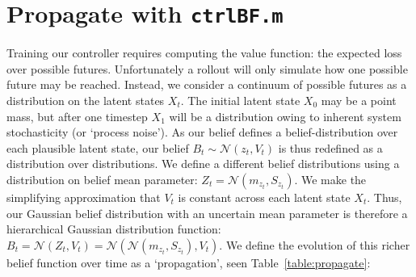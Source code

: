 \documentclass[9pt]{article}
\newcommand{\N}{\mathcal{N}}
\newcommand{\m}[1]{m_{#1}}                  %
\newcommand{\s}[1]{S_{#1}}                  %
\newcommand{\now}[1]{#1_t}                  %
\newcommand{\pno}[1]{#1_{t}}  %
\begin{document}
\newpage %


\section{Propagate with \texttt{ctrlBF.m}}

Training our controller requires computing the value function: the expected loss over possible futures.
Unfortunately a rollout will only simulate how one possible future may be reached.
Instead, we consider a continuum of possible futures as a distribution on the latent states $\now{X}$.
The initial latent state $X_0$ may be a point mass, but after one timestep $X_1$ will be a distribution owing to inherent system stochasticity (or `process noise').
As our belief defines a belief-distribution over each plausible latent state,
our belief $\pno{B} \sim \N(\pno{z},\pno{V})$ is thus redefined as a distribution over distributions.
We define a different belief distributions using a distribution on belief mean parameter: $\pno{Z} = \N(\m{\pno{z}},\s{\pno{z}})$.
We make the simplifying approximation that $\pno{V}$ is constant across each latent state $\now{X}$.
Thus, our Gaussian belief distribution with an uncertain mean parameter is therefore
a hierarchical Gaussian distribution function: $\pno{B} = \N(\pno{Z},\pno{V}) = \N(\N(\m{\pno{z}},\s{\pno{z}}),\pno{V})$.
We define the evolution of this richer belief function over time as a `propagation', seen Table~\ref{table:propagate}:
\end{document}

